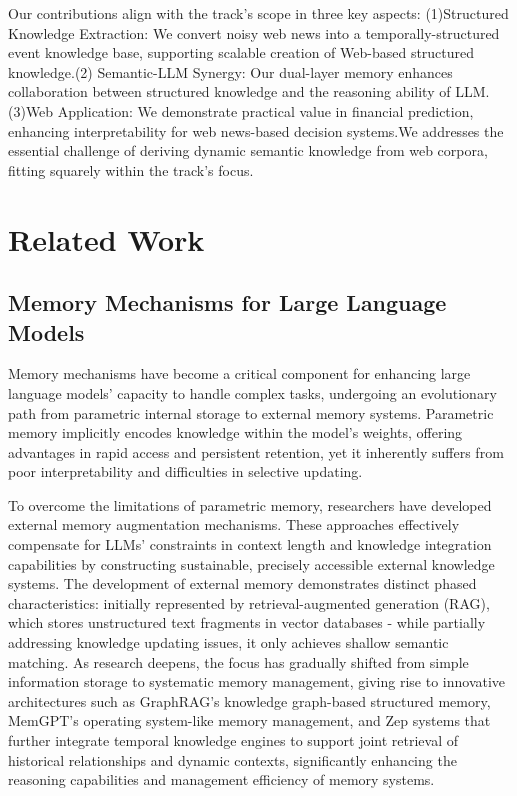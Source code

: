 \documentclass[sigconf, nonacm]{acmart} %
\begin{document}
Our contributions align with the track's scope in three key aspects:
(1)Structured Knowledge Extraction: We convert noisy web news into a temporally-structured event knowledge base, supporting scalable creation of Web-based structured knowledge.(2) Semantic-LLM Synergy: Our dual-layer memory enhances collaboration between structured knowledge and the reasoning ability of LLM.(3)Web Application: We demonstrate practical value in financial prediction, enhancing interpretability for web news-based decision systems.We addresses the essential challenge of deriving dynamic semantic knowledge from web corpora, fitting squarely within the track's focus.

\section{Related Work}
\subsection{Memory Mechanisms for Large Language Models}

Memory mechanisms have become a critical component for enhancing large language models' capacity to handle complex tasks, undergoing an evolutionary path from parametric internal storage to external memory systems. Parametric memory implicitly encodes knowledge within the model's weights, offering advantages in rapid access and persistent retention, yet it inherently suffers from poor interpretability and difficulties in selective updating.

To overcome the limitations of parametric memory, researchers have developed external memory augmentation mechanisms\cite{yang2024text}. These approaches effectively compensate for LLMs' constraints in context length and knowledge integration capabilities by constructing sustainable, precisely accessible external knowledge systems. The development of external memory demonstrates distinct phased characteristics: initially represented by retrieval-augmented generation (RAG)\cite{lewis2020retrieval}, which stores unstructured text fragments in vector databases - while partially addressing knowledge updating issues, it only achieves shallow semantic matching. As research deepens, the focus has gradually shifted from simple information storage to systematic memory management, giving rise to innovative architectures such as GraphRAG's\cite{edge2024local} knowledge graph-based structured memory, MemGPT's\cite{packer2023memgpt} operating system-like memory management, and Zep\cite{rasmussen2025zep} systems that further integrate temporal knowledge engines to support joint retrieval of historical relationships and dynamic contexts, significantly enhancing the reasoning capabilities and management efficiency of memory systems.
\end{document}
